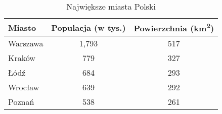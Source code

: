 \begin{table}[h]
  \centering
  \caption{Największe miasta Polski}
  \begin{tabular}{|l|c|c|}
    \hline
    \textbf{Miasto} & \textbf{Populacja (w tys.)} & \textbf{Powierzchnia (km\textsuperscript{2})} \\
    \hline
    Warszawa & 1,793 & 517 \\
    \hline
    Kraków & 779 & 327 \\
    \hline
    Łódź & 684 & 293 \\
    \hline
    Wrocław & 639 & 292 \\
    \hline
    Poznań & 538 & 261 \\
    \hline
  \end{tabular}
\end{table}